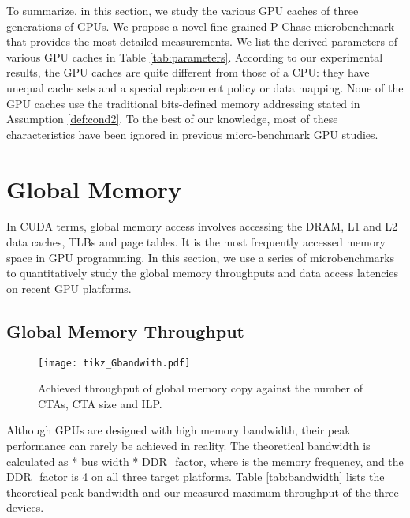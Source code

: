 \documentclass[10pt,journal,compsoc]{IEEEtran}
\theoremstyle{definition}
\begin{document}
\vspace{1em}

To summarize, in this section, we study the various GPU caches of three generations of GPUs. We propose a novel fine-grained P-Chase microbenchmark that provides the most detailed measurements. We list the derived parameters of various GPU caches in Table \ref{tab:parameters}. According to our experimental results, the GPU caches are quite different from those of a CPU: they have unequal cache sets and a special replacement policy or data mapping. None of the GPU caches use the traditional bits-defined memory addressing stated in Assumption \ref{def:cond2}. To the best of our knowledge, most of these characteristics have been ignored in previous micro-benchmark GPU studies.



\section{Global Memory}

In CUDA terms, global memory access involves accessing the DRAM, L1 and L2 data caches, TLBs and page tables. It is the most frequently accessed memory space in GPU programming. In this section, we use a series of microbenchmarks to quantitatively study the global memory throughputs and data access latencies on recent GPU platforms.

\subsection{Global Memory Throughput}
\begin{figure*}
  \centering
\texttt{[image: tikz\_Gbandwith.pdf]}
  \vspace{-1em}
  \caption{Achieved throughput of global memory copy against the number of CTAs, CTA size and ILP. }\label{fig:gbandwidth}
\end{figure*}

Although GPUs are designed with high memory bandwidth, their peak performance can rarely be achieved in reality. The theoretical bandwidth is calculated as  * bus width * DDR\_factor, where  is the memory frequency, and the DDR\_factor is 4 on all three target platforms. Table \ref{tab:bandwidth} lists the theoretical peak bandwidth and our measured maximum throughput of the three devices.
\end{document}
